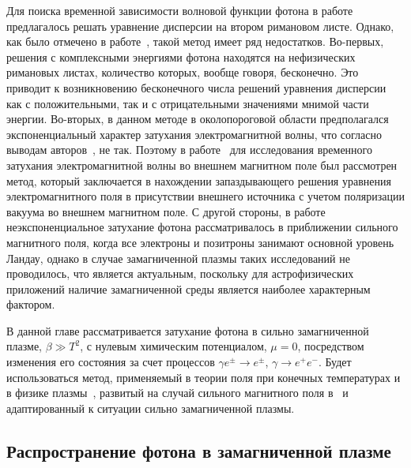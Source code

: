 Для поиска временной зависимости волновой функции фотона в 
работе~\cite{Shabad:1988} предлагалось решать уравнение дисперсии на втором 
римановом листе. Однако, как было отмечено в работе~\cite{MikhChist:2001}, 
такой метод имеет ряд недостатков. Во-первых, решения с комплексными энергиями 
фотона находятся на нефизических римановых листах, количество которых, вообще 
говоря, бесконечно. Это приводит к возникновению бесконечного числа решений 
уравнения дисперсии как с положительными, так и с отрицательными значениями 
мнимой части энергии. Во-вторых, в данном методе в околопороговой области 
предполагался экспоненциальный характер затухания электромагнитной волны, что 
согласно выводам авторов~\cite{MikhChist:2001}, не так. Поэтому 
в работе~\cite{MikhChist:2001} для исследования временного затухания 
электромагнитной волны во внешнем магнитном поле был рассмотрен метод, который 
заключается в нахождении запаздывающего решения уравнения электромагнитного 
поля в присутствии внешнего источника с учетом поляризации вакуума во внешнем 
магнитном поле. С другой стороны, в работе~\cite{MikhChist:2001} 
неэкспоненциальное затухание фотона рассматривалось в приближении сильного 
магнитного поля, когда все электроны и позитроны занимают основной уровень 
Ландау, однако в случае замагниченной плазмы таких исследований не проводилось, что является актуальным,  
поскольку для астрофизических приложений наличие замагниченной среды является 
наиболее характерным фактором.



В данной главе рассматривается затухание фотона в сильно замагниченной плазме, 
$\beta 
\gg T^2$,
 с нулевым химическим потенциалом, $\mu = 0$, посредством изменения его 
 состояния 
за счет процессов $\gamma e^\pm\to e^\pm$, $\gamma \to e^+e^-$. Будет 
использоваться метод, применяемый в теории поля при конечных температурах и в 
физике плазмы~\cite{Boyan}, развитый на случай сильного магнитного поля 
в~\cite{MikhChist:2001} и адаптированный к ситуации сильно замагниченной плазмы.

\subsection{Распространение фотона в замагниченной плазме}

